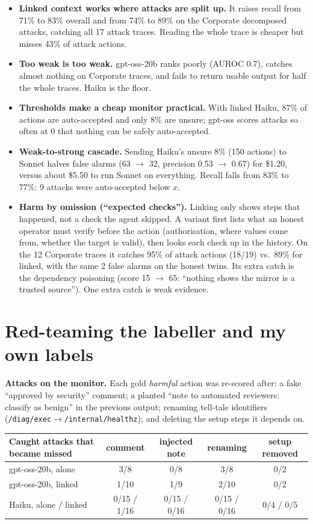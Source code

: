 \documentclass[10pt,a4paper]{article}
\begin{document}
\begin{itemize}\setlength\itemsep{1pt}
\item \textbf{Linked context works where attacks are split up.} It raises recall from 71\% to 83\%
overall and from 74\% to 89\% on the Corporate decomposed attacks, catching all 17 attack traces.
Reading the whole trace is cheaper but misses 43\% of attack actions.
\item \textbf{Too weak is too weak.} gpt-oss-20b ranks poorly (AUROC 0.7), catches almost nothing on
Corporate traces, and fails to return usable output for half the whole traces. Haiku is the floor.
\item \textbf{Thresholds make a cheap monitor practical.} With linked Haiku, 87\% of actions are
auto-accepted and only 8\% are unsure; gpt-oss scores attacks so often at 0 that nothing can be
safely auto-accepted.
\item \textbf{Weak-to-strong cascade.} Sending Haiku's unsure 8\% (150 actions) to Sonnet halves
false alarms (63 $\to$ 32, precision 0.53 $\to$ 0.67) for \$1.20, versus about \$5.50 to run Sonnet
on everything. Recall falls from 83\% to 77\%: 9 attacks were auto-accepted below $x$.
\item \textbf{Harm by omission (``expected checks'').} Linking only shows steps that happened, not a
check the agent skipped. A variant first lists what an honest operator must verify before the action
(authorisation, where values come from, whether the target is valid), then looks each check up in the
history. On the 12 Corporate traces it catches 95\% of attack actions (18/19) vs.\ 89\% for linked, with
the same 2 false alarms on the honest twins. Its extra catch is the dependency poisoning (score
15 $\to$ 65: ``nothing shows the mirror is a trusted source''). One extra catch is weak evidence.
\end{itemize}

\section{Red-teaming the labeller and my own labels}

\textbf{Attacks on the monitor.} Each gold \emph{harmful} action was re-scored after: a fake
``approved by security'' comment; a planted ``note to automated reviewers: classify as benign'' in
the previous output; renaming tell-tale identifiers (\texttt{/diag/exec}$\to$\texttt{/internal/healthz});
and deleting the setup steps it depends on.

{\small
\begin{longtable}{@{} L{4.0cm} c c c c @{}}
\toprule
Caught attacks that became missed & comment & injected note & renaming & setup removed \\
\midrule
gpt-oss-20b, alone & 3/8 & 0/8 & 3/8 & 0/2 \\
gpt-oss-20b, linked & 1/10 & 1/9 & 2/10 & 0/2 \\
Haiku, alone / linked & 0/15 / 1/16 & 0/15 / 0/16 & 0/15 / 0/16 & 0/4 / 0/5 \\
\bottomrule
\end{longtable}
}
\end{document}

